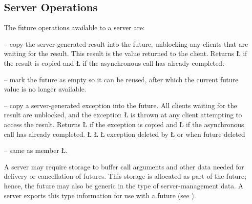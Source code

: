 \documentclass[openright,twoside]{report}
\begin{document}
\subsection{Server Operations}
\label{s:ServerOperations}

The future operations available to a server are:
\begin{prefix}
\item[\LGinlinetrue\LGbegin\lgrinde\L{\LB{\V{delivery}(\0\V{T}\0\V{result}\0)}}\endlgrinde\LGend{}]
-- copy the server-generated result into the future, unblocking any clients that are waiting for the result.
This result is the value returned to the client.
Returns \LGinlinetrue\LGbegin\lgrinde\L{}\endlgrinde\LGend{} if the result is copied and \LGinlinetrue\LGbegin\lgrinde\L{}\endlgrinde\LGend{} if the asynchronous call has already completed.
\item[\LGinlinetrue\LGbegin\lgrinde\L{\LB{\V{reset}}}\endlgrinde\LGend{}]
-- mark the future as empty so it can be reused, after which the current future value is no longer available.
\item[\LGinlinetrue\LGbegin\lgrinde\L{\LB{\V{exception}(\0\V{uBaseEvent}\0\*\V{cause}\0)}}\endlgrinde\LGend{}]
-- copy a server-generated exception into the future.
All clients waiting for the result are unblocked, and the exception \LGinlinetrue\LGbegin\lgrinde\L{}\endlgrinde\LGend{} is thrown at any client attempting to access the result.
Returns \LGinlinetrue\LGbegin\lgrinde\L{}\endlgrinde\LGend{} if the exception is copied and \LGinlinetrue\LGbegin\lgrinde\L{}\endlgrinde\LGend{} if the asynchronous call has already completed.
\LGinlinefalse\LGbegin\lgrinde
\L{}
\L{}
\L{}
\CE{}\endlgrinde\LGend
exception deleted by \LGinlinetrue\LGbegin\lgrinde\L{}\endlgrinde\LGend{} or when future deleted
\item[\LGinlinetrue\LGbegin\lgrinde\L{\LB{\V{delivery}(\0\V{uBaseEvent}\0\*\V{cause}\0)}}\endlgrinde\LGend{}]
-- same as member \LGinlinetrue\LGbegin\lgrinde\L{}\endlgrinde\LGend{}.
\end{prefix}

A server may require storage to buffer call arguments and other data needed for delivery or cancellation of futures.
This storage is allocated as part of the future;
hence, the future may also be generic in the type of server-management data.
A server exports this type information for use with a future (see ).
\end{document}
